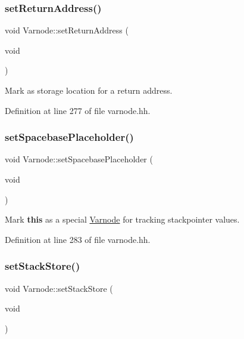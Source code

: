 \subsubsection{\texorpdfstring{setReturnAddress()}{setReturnAddress()}}
{\footnotesize\ttfamily void Varnode\+::set\+Return\+Address (\begin{DoxyParamCaption}\item[{void}]{ }\end{DoxyParamCaption})\hspace{0.3cm}{\ttfamily [inline]}}



Mark as storage location for a return address. 



Definition at line 277 of file varnode.\+hh.

\mbox{\label{class_varnode_a10d47d335479abe27b8ae75b35f26b02}} 
\subsubsection{\texorpdfstring{setSpacebasePlaceholder()}{setSpacebasePlaceholder()}}
{\footnotesize\ttfamily void Varnode\+::set\+Spacebase\+Placeholder (\begin{DoxyParamCaption}\item[{void}]{ }\end{DoxyParamCaption})\hspace{0.3cm}{\ttfamily [inline]}}



Mark {\bfseries{this}} as a special \mbox{\hyperlink{class_varnode}{Varnode}} for tracking stackpointer values. 



Definition at line 283 of file varnode.\+hh.

\mbox{\label{class_varnode_a436a339108f2a3de35d1faea16d95a9d}} 
\subsubsection{\texorpdfstring{setStackStore()}{setStackStore()}}
{\footnotesize\ttfamily void Varnode\+::set\+Stack\+Store (\begin{DoxyParamCaption}\item[{void}]{ }\end{DoxyParamCaption})\hspace{0.3cm}{\ttfamily [inline]}}



